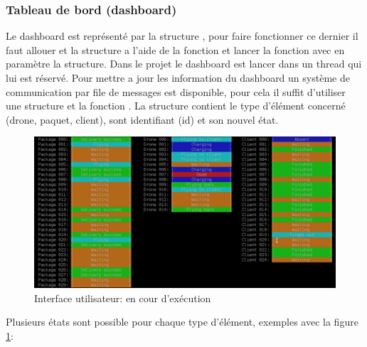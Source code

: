 \documentclass[article, backcover, french, nodocumentinfo]{upmethodology-document}
\begin{document}
			\subsubsection{Tableau de bord (dashboard)}
					Le dashboard est représenté par la structure , pour faire fonctionner ce dernier il faut allouer et la structure a l'aide de la fonction  et lancer la fonction  avec en paramètre la structure. Dans le projet le dashboard est lancer dans un thread qui lui est réservé.
					Pour mettre a jour les information du dashboard un système de communication par file de messages est disponible, pour cela il suffit d'utiliser une structure  et la fonction . La structure  contient le type d'élément concerné (drone, paquet, client), sont identifiant (id) et son nouvel état.
					\begin{figure}[H]
						\centering
						\includegraphics[width=\textwidth]{figures/UI1}
						\caption{Interface utilisateur: en cour d’exécution}
						\label{fig:UIrunning}
					\end{figure}
					Plusieurs états sont possible pour chaque type d'élément, exemples avec la figure \ref{fig:UIrunning}:
\end{document}
